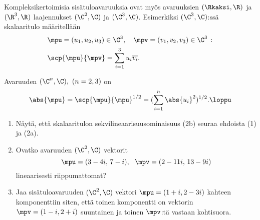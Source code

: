 \begin{Exa} Kompleksikertoimisia sisätuloavaruuksia ovat myös avaruuksien $(\Rkaksi, \R)$ ja
$(\R^3,\R)$ laajennukset $(\C^2,\C)$ ja $(\C^3,\C)$. Esimerkiksi $(\C^3,\C)$:ssä skalaaritulo
määritellään
\begin{align*}
&\mpu =(u_1,u_2,u_3) \in \C^3, \quad \mpv =(v_1,v_2,v_3) \in \C^3\,: \\
&\scp{\mpu}{\mpv} = \sum_{i=1}^3 u_i \overline{v_i}.
\end{align*}
\end{Exa}
Avaruuden $(\C^n, \C),\ (n=2,3)$ 
 on
\[
\abs{\mpu} = \scp{\mpu}{\mpu}^{1/2} = ( \sum_{i=1}^n \abs{u_i}^2 )^{1/2}. \loppu
\]

\Harj
\begin{enumerate}

\item \label{H-III-4: skalaaritulo}
Näytä, että skalaaritulon sekvilineaarisuusominaisuus (2b) seuraa ehdoista (1) ja (2a).

\item
Ovatko avaruuden $(\C^2,\C)$ vektorit 
\[
\mpu=(3-4i,\,7-i), \ \ \mpv=(2-11i,\,13-9i)
\]
lineaarisesti riippumattomat?
 
\item
Jaa sisätuloavaruuden $(\C^2,\C)$ vektori $\mpu=(1+i,2-3i)$ kahteen komponenttiin siten, että
toinen komponentti on vektorin $\mpv=(1-i,2+i)$ suuntainen ja toinen $\mpv$:tä vastaan
kohtisuora.

\end{enumerate}